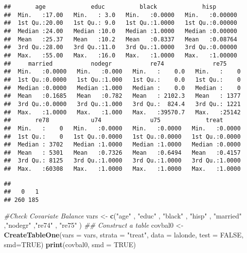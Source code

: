 \documentclass[]{article}
\newenvironment{Shaded}{\begin{snugshade}}{\end{snugshade}}
\newcommand{\CommentTok}[1]{\textcolor[rgb]{0.56,0.35,0.01}{\textit{#1}}}
\newcommand{\DataTypeTok}[1]{\textcolor[rgb]{0.13,0.29,0.53}{#1}}
\newcommand{\KeywordTok}[1]{\textcolor[rgb]{0.13,0.29,0.53}{\textbf{#1}}}
\newcommand{\NormalTok}[1]{#1}
\newcommand{\OperatorTok}[1]{\textcolor[rgb]{0.81,0.36,0.00}{\textbf{#1}}}
\newcommand{\OtherTok}[1]{\textcolor[rgb]{0.56,0.35,0.01}{#1}}
\newcommand{\StringTok}[1]{\textcolor[rgb]{0.31,0.60,0.02}{#1}}
\begin{document}
\begin{verbatim}
##       age             educ          black             hisp        
##  Min.   :17.00   Min.   : 3.0   Min.   :0.0000   Min.   :0.00000  
##  1st Qu.:20.00   1st Qu.: 9.0   1st Qu.:1.0000   1st Qu.:0.00000  
##  Median :24.00   Median :10.0   Median :1.0000   Median :0.00000  
##  Mean   :25.37   Mean   :10.2   Mean   :0.8337   Mean   :0.08764  
##  3rd Qu.:28.00   3rd Qu.:11.0   3rd Qu.:1.0000   3rd Qu.:0.00000  
##  Max.   :55.00   Max.   :16.0   Max.   :1.0000   Max.   :1.00000  
##     married           nodegr           re74              re75      
##  Min.   :0.0000   Min.   :0.000   Min.   :    0.0   Min.   :    0  
##  1st Qu.:0.0000   1st Qu.:1.000   1st Qu.:    0.0   1st Qu.:    0  
##  Median :0.0000   Median :1.000   Median :    0.0   Median :    0  
##  Mean   :0.1685   Mean   :0.782   Mean   : 2102.3   Mean   : 1377  
##  3rd Qu.:0.0000   3rd Qu.:1.000   3rd Qu.:  824.4   3rd Qu.: 1221  
##  Max.   :1.0000   Max.   :1.000   Max.   :39570.7   Max.   :25142  
##       re78            u74              u75             treat       
##  Min.   :    0   Min.   :0.0000   Min.   :0.0000   Min.   :0.0000  
##  1st Qu.:    0   1st Qu.:0.0000   1st Qu.:0.0000   1st Qu.:0.0000  
##  Median : 3702   Median :1.0000   Median :1.0000   Median :0.0000  
##  Mean   : 5301   Mean   :0.7326   Mean   :0.6494   Mean   :0.4157  
##  3rd Qu.: 8125   3rd Qu.:1.0000   3rd Qu.:1.0000   3rd Qu.:1.0000  
##  Max.   :60308   Max.   :1.0000   Max.   :1.0000   Max.   :1.0000
\end{verbatim}

\begin{Shaded}
\end{Shaded}

\begin{verbatim}
## 
##   0   1 
## 260 185
\end{verbatim}

\begin{Shaded}
\begin{Highlighting}[]
\CommentTok{#Check Covariate Balance}
\NormalTok{vars <-}\StringTok{ }\KeywordTok{c}\NormalTok{(}\StringTok{"age"}\NormalTok{  ,   }\StringTok{"educ"}\NormalTok{ ,   }\StringTok{"black"}\NormalTok{  , }\StringTok{"hisp"}\NormalTok{   , }\StringTok{"married"}\NormalTok{ ,}\StringTok{"nodegr"}\NormalTok{  ,}\StringTok{"re74"}\NormalTok{  ,  }\StringTok{"re75"}\NormalTok{ )}
\CommentTok{## Construct a table}
\NormalTok{covbal0 <-}\StringTok{ }\KeywordTok{CreateTableOne}\NormalTok{(}\DataTypeTok{vars =}\NormalTok{ vars, }\DataTypeTok{strata =} \StringTok{"treat"}\NormalTok{, }\DataTypeTok{data =}\NormalTok{ lalonde, }\DataTypeTok{test =} \OtherTok{FALSE}\NormalTok{, }\DataTypeTok{smd=}\OtherTok{TRUE}\NormalTok{)}
\KeywordTok{print}\NormalTok{(covbal0, }\DataTypeTok{smd =} \OtherTok{TRUE}\NormalTok{)}
\end{Highlighting}
\end{Shaded}
\end{document}
